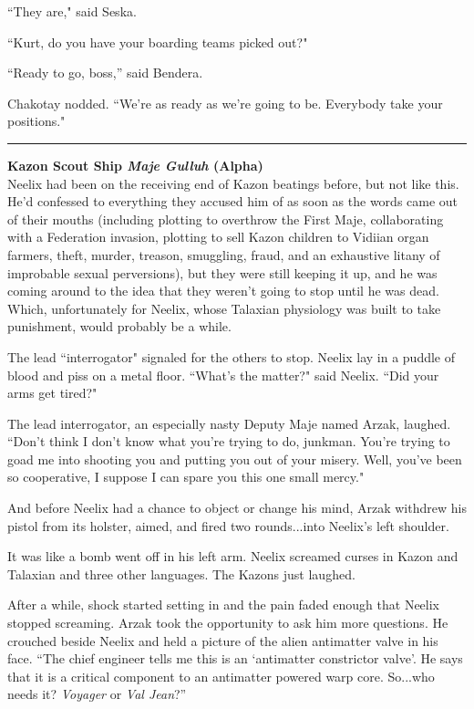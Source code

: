 \documentclass[twoside,letterpaper,12pt]{memoir}
\begin{document}
``They are," said Seska.

``Kurt, do you have your boarding teams picked out?"

``Ready to go, boss,” said Bendera.

Chakotay nodded. ``We're as ready as we're going to be. Everybody take your positions."

\fancybreak{\rule{3cm}{0.4 pt}}
\noindent\textbf{Kazon Scout Ship \textit{Maje Gulluh} (Alpha)}\\

Neelix had been on the receiving end of Kazon beatings before, but not like this. He'd confessed to everything they accused him of as soon as the words came out of their mouths (including plotting to overthrow the First Maje, collaborating with a Federation invasion, plotting to sell Kazon children to Vidiian organ farmers, theft, murder, treason, smuggling, fraud, and an exhaustive litany of improbable sexual perversions), but they were still keeping it up, and he was coming around to the idea that they weren't going to stop until he was dead. Which, unfortunately for Neelix, whose Talaxian physiology was built to take punishment, would probably be a while.

The lead ``interrogator" signaled for the others to stop. Neelix lay in a puddle of blood and piss on a metal floor. ``What's the matter?" said Neelix. ``Did your arms get tired?"

The lead interrogator, an especially nasty Deputy Maje named Arzak, laughed. ``Don't think I don't know what you're trying to do, junkman. You're trying to goad me into shooting you and putting you out of your misery. Well, you've been so cooperative, I suppose I can spare you this one small mercy."

And before Neelix had a chance to object or change his mind, Arzak withdrew his pistol from its holster, aimed, and fired two rounds...into Neelix's left shoulder.

It was like a bomb went off in his left arm. Neelix screamed curses in Kazon and Talaxian and three other languages. The Kazons just laughed.

After a while, shock started setting in and the pain faded enough that Neelix stopped screaming. Arzak took the opportunity to ask him more questions. He crouched beside Neelix and held a picture of the alien antimatter valve in his face. ``The chief engineer tells me this is an ‘antimatter constrictor valve’. He says that it is a critical component to an antimatter powered warp core. So...who needs it? \textit{Voyager} or \textit{Val Jean}?”
\end{document}
